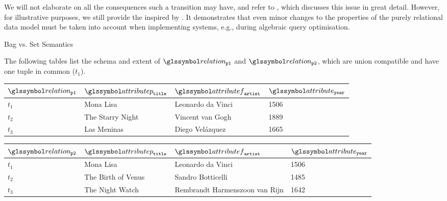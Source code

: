 We will not elaborate on all the consequences such a transition may have, and refer to \cite{Garcia:2009Database}, which discusses this issue in great detail. However, for illustrative  purposes, we still provide the  inspired by \cite{Garcia:2009Database}. It demonstrates that even minor changes to the properties of the purely relational data model must be taken into account when implementing systems, e.g., during algebraic query optimisation.

\begin{example}[label=example:bag_vs_set]{Bag vs. Set Semantics}{}

    The following tables list the schema and extent of $\relation_{\mathtt{p1}}$ and $\relation_{\mathtt{p2}}$, which are union compatible and have one tuple in common ($t_1$).

    \begin{center}
        \begin{tabular}{ l || l | l | l |}
            $\relation_{\mathtt{p1}}$ & $\attributep_{\mathtt{title}}$  & $\attributef_{\mathtt{artist}}$  & $\attribute_{\mathtt{year}}$ \\ 
            \hline
            \hline
            $t_1$ & Mona Lisa &  Leonardo da Vinci & 1506 \\
            \hline
            $t_2$ & The Starry Night & Vincent van Gogh & 1889 \\
            \hline
            $t_3$ & Las Meninas & Diego Velázquez & 1665 \\
            \hline
        \end{tabular}
    \end{center}

    \begin{center}
        \begin{tabular}{ l || l | l | l |}
            $\relation_{\mathtt{p2}}$ & $\attributep_{\mathtt{title}}$  & $\attributef_{\mathtt{artist}}$  & $\attribute_{\mathtt{year}}$ \\ 
            \hline
            \hline
            $t_1$ & Mona Lisa &  Leonardo da Vinci & 1506 \\
            \hline
            $t_2$ & The Birth of Venus & Sandro Botticelli & 1485 \\
            \hline
            $t_3$ & The Night Watch & Rembrandt Harmenszoon van Rijn & 1642 \\
            \hline
        \end{tabular}
    \end{center}
    

\end{example}
